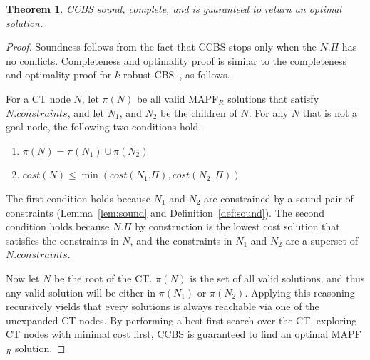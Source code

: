 \documentclass[review]{elsarticle}
\newtheorem{theorem}{Theorem}
\newcommand{\cost}{\textit{cost}}
\newcommand\konstantin[1]{\nb{\textbf{Konstantin:}}{red}{#1}}
\newcommand\roni[1]{\nb{\textbf{Roni:}}{green}{#1}}
\newcommand\dor[1]{\nb{\textbf{Dor:}}{Fuchsia}{#1}}
\newcommand{\ccbs}{\ac{CCBS}\xspace}
\newcommand{\cbs}{\ac{CBS}\xspace}
\newcommand{\mapfr}{\ac{MAPF}$_R$\xspace}
\newcommand{\shortcite}{\cite}
\begin{document}
\begin{theorem}
\ccbs sound, complete, and is guaranteed to return an optimal solution. 
\label{the:optimal}
\end{theorem}
\begin{proof}
Soundness follows from the fact that \ccbs stops only when the $N.\Pi$ has no conflicts. 
Completeness and optimality proof is similar to the completeness and optimality proof for $k$-robust \cbs~\shortcite{atzmon2018robust}, as follows. 

For a CT node $N$, let $\pi(N)$ be all valid \mapfr{} solutions that satisfy $N.constraints$, and let $N_1$, and $N_2$ be the children of $N$. For any $N$ that is not a goal node, the following two conditions hold.
\begin{enumerate}
    \item $\pi(N)=\pi(N_1)\cup\pi(N_2)$
    \item $\cost(N)\leq \min(\cost(N_1.\Pi), \cost(N_2,\Pi))$
\end{enumerate}
The first condition holds because $N_1$ and $N_2$ are constrained by a sound pair of constraints (Lemma~\ref{lem:sound} and Definition~\ref{def:sound}). 
The second condition holds because $N.\Pi$ by construction is the lowest cost solution that satisfies the constraints in $N$, and the constraints in $N_1$ and $N_2$ are a superset of $N.constraints$. 


Now let $N$ be the root of the CT. 
$\pi(N)$ is the set of all valid solutions, 
and thus any valid solution will be either in $\pi(N_1)$ or $\pi(N_2)$. Applying this reasoning recursively yields that every solutions is always reachable via one of the unexpanded CT nodes. 
By performing a best-first search over the CT, exploring CT nodes with minimal cost first, \ccbs{} is guaranteed to find an optimal  \mapfr{} solution. 
\end{proof}

\end{document}
